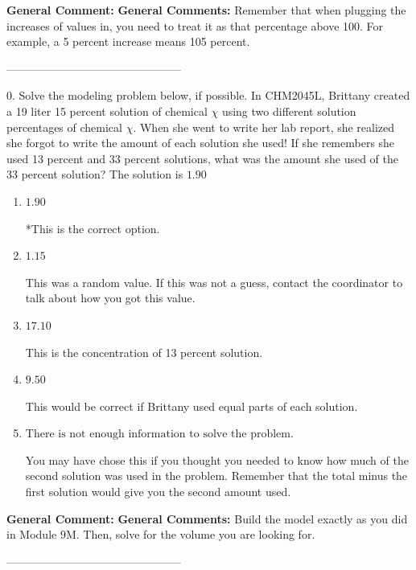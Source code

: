 \documentclass{extbook}[14pt]
\begin{document}
\textbf{General Comment:} \textbf{General Comments:} Remember that when plugging the increases of values in, you need to treat it as that percentage above 100. For example, a 5 percent increase means 105 percent. 

-----------------------------------------------

0. Solve the modeling problem below, if possible.
In CHM2045L, Brittany created a 19 liter 15 percent solution of chemical $\chi$ using two different solution percentages of chemical $\chi$. When she went to write her lab report, she realized she forgot to write the amount of each solution she used! If she remembers she used 13 percent and 33 percent solutions, what was the amount she used of the 33 percent solution? 
The solution is $ 1.90 $ 

\begin{enumerate}[label=\Alph*.] 
\item $ 1.90 $ 

 *This is the correct option. 
\item $ 1.15 $ 

 This was a random value. If this was not a guess, contact the coordinator to talk about how you got this value. 
\item $ 17.10 $ 

 This is the concentration of 13 percent solution. 
\item $ 9.50 $ 

 This would be correct if Brittany used equal parts of each solution. 
\item $ \text{There is not enough information to solve the problem.} $ 

 You may have chose this if you thought you needed to know how much of the second solution was used in the problem. Remember that the total minus the first solution would give you the second amount used. 
\end{enumerate} 
 
\textbf{General Comment:} \textbf{General Comments:} Build the model exactly as you did in Module 9M. Then, solve for the volume you are looking for. 

-----------------------------------------------
\end{document}
